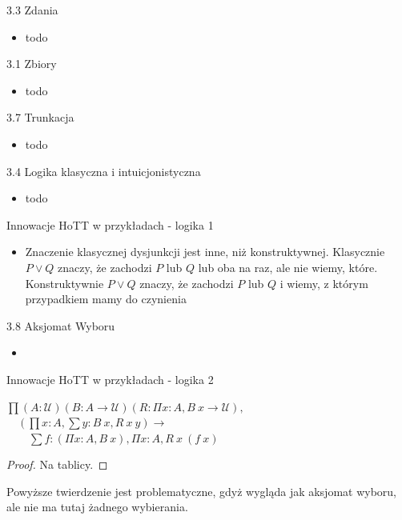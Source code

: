 \documentclass{beamer}
\begin{document}
\begin{frame}{3.3 Zdania}
\begin{itemize}
	\item todo
\end{itemize}
\end{frame}

\begin{frame}{3.1 Zbiory}
\begin{itemize}
	\item todo
\end{itemize}
\end{frame}

\begin{frame}{3.7 Trunkacja}
\begin{itemize}
	\item todo
\end{itemize}
\end{frame}

\begin{frame}{3.4 Logika klasyczna i intuicjonistyczna}
\begin{itemize}
	\item todo
\end{itemize}
\end{frame}

\begin{frame}{Innowacje HoTT w przykładach - logika 1}
\begin{itemize}
	\item Znaczenie klasycznej dysjunkcji jest inne, niż konstruktywnej. Klasycznie $P \lor Q$ znaczy, że zachodzi $P$ lub $Q$ lub oba na raz, ale nie wiemy, które. Konstruktywnie $P \lor Q$ znaczy, że zachodzi $P$ lub $Q$ i wiemy, z którym przypadkiem mamy do czynienia
\end{itemize}
\end{frame}

\begin{frame}{3.8 Aksjomat Wyboru}
\begin{itemize}
	\item
\end{itemize}
\end{frame}

\begin{frame}{Innowacje HoTT w przykładach - logika 2}
\begin{theorem}
$\textstyle \prod (A : \mathcal{U}) (B : A \to \mathcal{U}) (R : \Pi x : A, B\ x \to \mathcal{U}),$ \\
	$\textstyle \quad (\prod x : A, \sum y : B\ x, R\ x\ y) \to$ \\
		$\textstyle \qquad \sum f : (\Pi x : A, B\ x), \Pi x : A, R\ x\ (f\ x)$
\end{theorem}
\begin{proof}
	Na tablicy.
\end{proof}

Powyższe twierdzenie jest problematyczne, gdyż wygląda jak aksjomat wyboru, ale nie ma tutaj żadnego wybierania.

\end{frame}
\end{document}
